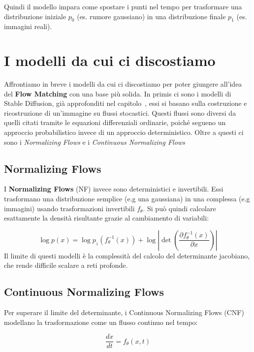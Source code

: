 Quindi il modello impara come spostare i punti nel tempo per trasformare una distribuzione iniziale $p_0$ (es. rumore gaussiano) in una distribuzione finale $p_1$ (es. immagini reali).

\section{I modelli da cui ci discostiamo}

Affrontiamo in breve i modelli da cui ci discostiamo per poter giungere all'idea del \textbf{Flow Matching} con una base più solida. In primis ci sono i modelli di Stable Diffusion, già approfonditi nel capitolo~\label{chapter15}, essi si basano sulla costruzione e ricostruzione di un'immagine su flussi stocastici. Questi flussi sono diversi da quelli citati tramite le equazioni differenziali ordinarie, poiché segueno un approccio probabilistico invece di un approccio deterministico. Oltre a questi ci sono i \textit{Normalizing Flows} e i \textit{Continuous Normalizing Flows}

\subsection{Normalizing Flows}
I \textbf{Normalizing Flows} (NF) invece sono deterministici e invertibili. Essi trasformano una distribuzione semplice (e.g una gaussiana) in una complessa (e.g immagini) usando trasformazioni invertibili $f_\theta$. Si può quindi calcolare esattamente la densità risultante grazie al cambiamento di variabili:

\begin{equation}
    \log p(x) = \log p_z(f_\theta^{-1}(x)) + \log \left|\det\left(\frac{\partial f_\theta^{-1}(x)}{\partial x}\right)\right|
\end{equation}
Il limite di questi modelli è la complessità del calcolo del determinante jacobiano, che rende difficile scalare a reti profonde.

\subsection{Continuous Normalizing Flows}
Per superare il limite del determinante, i Continuous Normalizing Flows (CNF)~\cite{} modellano la trasformazione come un flusso continuo nel tempo:

\begin{equation}
    \frac{dx}{dt} =f_\theta(x,t)
\end{equation}

